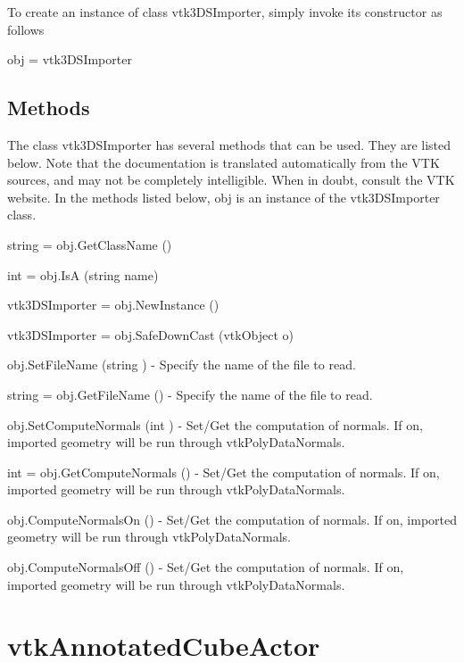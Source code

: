 To create an instance of class vtk3\-D\-S\-Importer, simply invoke its constructor as follows \begin{DoxyVerb}  obj = vtk3DSImporter
\end{DoxyVerb}
 \hypertarget{vtkwidgets_vtkxyplotwidget_Methods}{}\subsection{Methods}\label{vtkwidgets_vtkxyplotwidget_Methods}
The class vtk3\-D\-S\-Importer has several methods that can be used. They are listed below. Note that the documentation is translated automatically from the V\-T\-K sources, and may not be completely intelligible. When in doubt, consult the V\-T\-K website. In the methods listed below, {\ttfamily obj} is an instance of the vtk3\-D\-S\-Importer class. 
\begin{DoxyItemize}
\item {\ttfamily string = obj.\-Get\-Class\-Name ()}  
\item {\ttfamily int = obj.\-Is\-A (string name)}  
\item {\ttfamily vtk3\-D\-S\-Importer = obj.\-New\-Instance ()}  
\item {\ttfamily vtk3\-D\-S\-Importer = obj.\-Safe\-Down\-Cast (vtk\-Object o)}  
\item {\ttfamily obj.\-Set\-File\-Name (string )} -\/ Specify the name of the file to read.  
\item {\ttfamily string = obj.\-Get\-File\-Name ()} -\/ Specify the name of the file to read.  
\item {\ttfamily obj.\-Set\-Compute\-Normals (int )} -\/ Set/\-Get the computation of normals. If on, imported geometry will be run through vtk\-Poly\-Data\-Normals.  
\item {\ttfamily int = obj.\-Get\-Compute\-Normals ()} -\/ Set/\-Get the computation of normals. If on, imported geometry will be run through vtk\-Poly\-Data\-Normals.  
\item {\ttfamily obj.\-Compute\-Normals\-On ()} -\/ Set/\-Get the computation of normals. If on, imported geometry will be run through vtk\-Poly\-Data\-Normals.  
\item {\ttfamily obj.\-Compute\-Normals\-Off ()} -\/ Set/\-Get the computation of normals. If on, imported geometry will be run through vtk\-Poly\-Data\-Normals.  
\end{DoxyItemize}\hypertarget{vtkhybrid_vtkannotatedcubeactor}{}\section{vtk\-Annotated\-Cube\-Actor}\label{vtkhybrid_vtkannotatedcubeactor}
